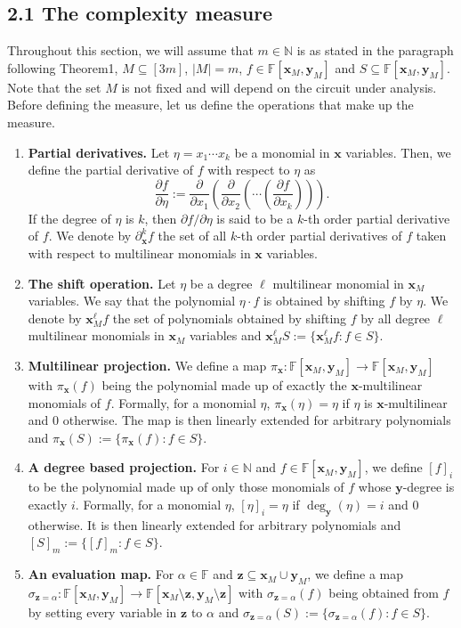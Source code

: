 \subsection*{2.1 The complexity measure}
Throughout this section, we will assume that $m\in\mathbb N$ is as stated in the paragraph following Theorem1, $M\subseteq[3m]$, $|M|=m$, $f\in\mathbb F[\mathbf x_M,\mathbf y_M]$ and $S\subseteq\mathbb F[\mathbf x_M,\mathbf y_M]$. Note that the set $M$ is not fixed and will depend on the circuit under analysis. Before defining the measure, let us define the operations that make up the measure.
\begin{enumerate}
\item \textbf{Partial derivatives.} Let $\eta=x_1\cdots x_k$ be a monomial in $\mathbf x$ variables. Then, we define the partial derivative of $f$ with respect to $\eta$ as
\[
\frac{\partial f}{\partial\eta}:=\frac{\partial}{\partial x_1}\left(\frac{\partial}{\partial x_2}\left(\cdots\left(\frac{\partial f}{\partial x_k}\right)\right)\right).
\]
If the degree of $\eta$ is $k$, then $\partial f/\partial\eta$ is said to be a $k$-th order partial derivative of $f$. We denote by $\partial_{\mathbf x}^kf$ the set of all $k$-th order partial derivatives of $f$ taken with respect to multilinear monomials in $\mathbf x$ variables.
\item \textbf{The shift operation.} Let $\eta$ be a degree $\ell$ multilinear monomial in $\mathbf x_M$ variables. We say that the polynomial $\eta\cdot f$ is obtained by shifting $f$ by $\eta$. We denote by $\mathbf x_M^\ell f$ the set of polynomials obtained by shifting $f$ by all degree $\ell$ multilinear monomials in $\mathbf x_M$ variables and $\mathbf x_M^\ell S:=\{\mathbf x_M^\ell f:f\in S\}$.
\item \textbf{Multilinear projection.} We define a map $\pi_{\mathbf x}:\mathbb F[\mathbf x_M,\mathbf y_M]\to\mathbb F[\mathbf x_M,\mathbf y_M]$ with $\pi_{\mathbf x}(f)$ being the polynomial made up of exactly the $\mathbf x$-multilinear monomials of $f$. Formally, for a monomial $\eta$, $\pi_{\mathbf x}(\eta)=\eta$ if $\eta$ is $\mathbf x$-multilinear and 0 otherwise. The map is then linearly extended for arbitrary polynomials and $\pi_{\mathbf x}(S):=\{\pi_{\mathbf x}(f):f\in S\}$.
\item \textbf{A degree based projection.} For $i\in\mathbb N$ and $f\in\mathbb F[\mathbf x_M,\mathbf y_M]$, we define $[f]_i$ to be the polynomial made up of only those monomials of $f$ whose $\mathbf y$-degree is exactly $i$. Formally, for a monomial $\eta$, $[\eta]_i=\eta$ if $\deg_{\mathbf y}(\eta)=i$ and 0 otherwise. It is then linearly extended for arbitrary polynomials and $[S]_m:=\{[f]_m:f\in S\}$.
\item \textbf{An evaluation map.} For $\alpha\in\mathbb F$ and $\mathbf z\subseteq\mathbf x_M\cup\mathbf y_M$, we define a map $\sigma_{\mathbf z=\alpha}:\mathbb F[\mathbf x_M,\mathbf y_M]\to\mathbb F[\mathbf x_M\setminus\mathbf z,\mathbf y_M\setminus\mathbf z]$ with $\sigma_{\mathbf z=\alpha}(f)$ being obtained from $f$ by setting every variable in $\mathbf z$ to $\alpha$ and $\sigma_{\mathbf z=\alpha}(S):=\{\sigma_{\mathbf z=\alpha}(f):f\in S\}$.
\end{enumerate}
